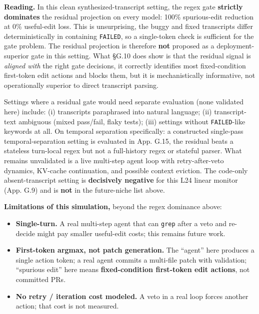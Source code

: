 \documentclass[
  11pt,
  a4paper]{article}
\newcounter{none} %
\providecommand{\tightlist}{%
  \setlength{\itemsep}{0pt}\setlength{\parskip}{0pt}}
\begin{document}
\textbf{Reading.} In this clean synthesized-transcript setting, the
regex gate \textbf{strictly dominates} the residual projection on every
model: 100\% spurious-edit reduction at 0\% useful-edit loss. This is
unsurprising, the buggy and fixed transcripts differ deterministically
in containing \texttt{FAILED}, so a single-token check is sufficient for
the gate problem. The residual projection is therefore \textbf{not}
proposed as a deployment-superior gate in this setting. What \S{}G.10 does
show is that the residual signal is \emph{aligned with} the right gate
decisions, it correctly identifies most fixed-condition first-token edit
actions and blocks them, but it is mechanistically informative, not
operationally superior to direct transcript parsing.

Settings where a residual gate would need separate evaluation (none
validated here) include: (i) transcripts paraphrased into natural
language; (ii) transcript-text ambiguous (mixed pass/fail, flaky tests);
(iii) settings without \texttt{FAILED}-like keywords at all. On temporal
separation specifically: a constructed single-pass temporal-separation
setting is evaluated in App. G.15, the residual beats a stateless
turn-local regex but not a full-history regex or stateful parser. What
remains unvalidated is a live multi-step agent loop with
retry-after-veto dynamics, KV-cache continuation, and possible context
eviction. The code-only absent-transcript setting is \textbf{decisively
negative} for this L24 linear monitor (App. G.9) and is \textbf{not} in
the future-niche list above.

\textbf{Limitations of this simulation,} beyond the regex dominance
above:

\begin{itemize}
\tightlist
\item
  \textbf{Single-turn.} A real multi-step agent that can \texttt{grep}
  after a veto and re-decide might pay smaller useful-edit costs; this
  remains future work.
\item
  \textbf{First-token argmax, not patch generation.} The ``agent'' here
  produces a single action token; a real agent commits a multi-file
  patch with validation; ``spurious edit'' here means
  \textbf{fixed-condition first-token edit actions}, not committed PRs.
\item
  \textbf{No retry / iteration cost modeled.} A veto in a real loop
  forces another action; that cost is not measured.
\end{itemize}
\end{document}
